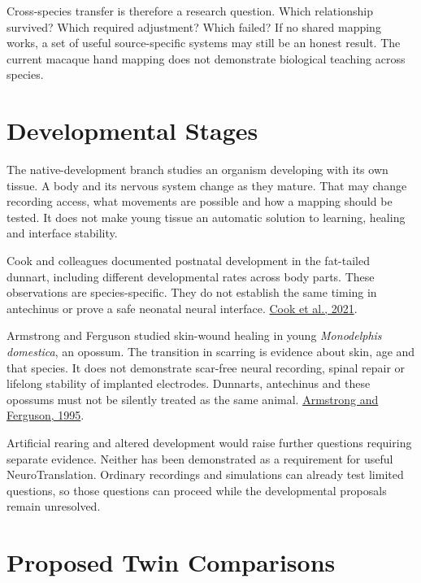 Cross-species transfer is therefore a research question. Which relationship survived? Which required adjustment? Which failed? If no shared mapping works, a set of useful source-specific systems may still be an honest result. The current macaque hand mapping does not demonstrate biological teaching across species.\par

\section{Developmental Stages}

The native-development branch studies an organism developing with its own tissue. A body and its nervous system change as they mature. That may change recording access, what movements are possible and how a mapping should be tested. It does not make young tissue an automatic solution to learning, healing and interface stability.\par

Cook and colleagues documented postnatal development in the fat-tailed dunnart, including different developmental rates across body parts. These observations are species-specific. They do not establish the same timing in antechinus or prove a safe neonatal neural interface. \href{https://www.nature.com/articles/s42003-021-02506-2}{Cook et al., 2021}.\par

Armstrong and Ferguson studied skin-wound healing in young \emph{Monodelphis domestica}, an opossum. The transition in scarring is evidence about skin, age and that species. It does not demonstrate scar-free neural recording, spinal repair or lifelong stability of implanted electrodes. Dunnarts, antechinus and these opossums must not be silently treated as the same animal. \href{https://pubmed.ncbi.nlm.nih.gov/7750642/}{Armstrong and Ferguson, 1995}.\par

Artificial rearing and altered development would raise further questions requiring separate evidence. Neither has been demonstrated as a requirement for useful NeuroTranslation. Ordinary recordings and simulations can already test limited questions, so those questions can proceed while the developmental proposals remain unresolved.\par

\section{Proposed Twin Comparisons}

